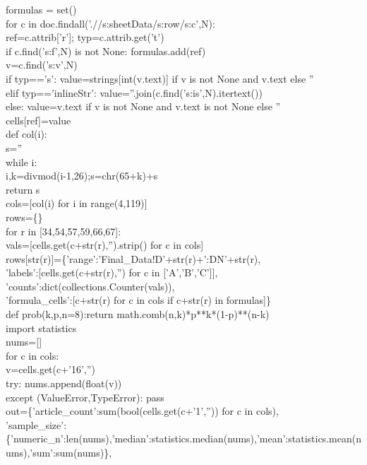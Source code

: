 \documentclass[10pt]{article}
\begin{document}
{    formulas = set()\\
    for c in doc.findall('.//s:sheetData/s:row/s:c',N):\\
        ref=c.attrib['r']; typ=c.attrib.get('t')\\
        if c.find('s:f',N) is not None: formulas.add(ref)\\
        v=c.find('s:v',N)\\
        if typ=='s': value=strings[int(v.text)] if v is not None and v.text else ''\\
        elif typ=='inlineStr': value=''.join(c.find('s:is',N).itertext())\\
        else: value=v.text if v is not None and v.text is not None else ''\\
        cells[ref]=value\\
def col(i):\\
    s=''\\
    while i:\\
        i,k=divmod(i-1,26);s=chr(65+k)+s\\
    return s\\
cols=[col(i) for i in range(4,119)]\\
rows=\{\}\\
for r in [34,54,57,59,66,67]:\\
    vals=[cells.get(c+str(r),'').strip() for c in cols]\\
    rows[str(r)]=\{'range':'Final\_Data!D'+str(r)+':DN'+str(r),\\
      'labels':[cells.get(c+str(r),'') for c in ['A','B','C']],\\
      'counts':dict(collections.Counter(vals)),\\
      'formula\_cells':[c+str(r) for c in cols if c+str(r) in formulas]\}\\
def prob(k,p,n=8):return math.comb(n,k)*p**k*(1-p)**(n-k)\\
import statistics\\
nums=[]\\
for c in cols:\\
    v=cells.get(c+'16','')\\
    try: nums.append(float(v))\\
    except (ValueError,TypeError): pass\\
out=\{'article\_count':sum(bool(cells.get(c+'1','')) for c in cols),\\
     'sample\_size':\{'numeric\_n':len(nums),'median':statistics.median(nums),'mean':statistics.mean(nums),'sum':sum(nums)\},\\
}
\end{document}
